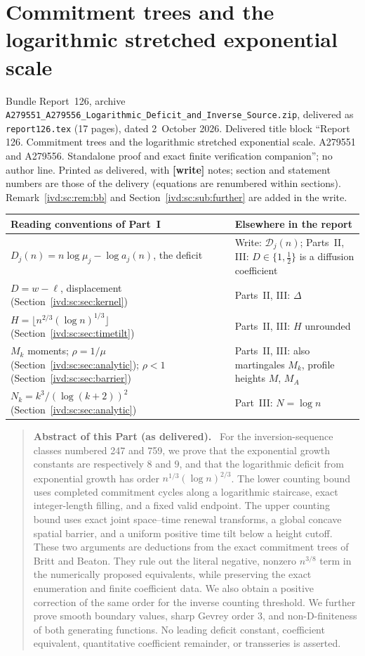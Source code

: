 \documentclass[11pt,letterpaper]{article}
\theoremstyle{remark}\newtheorem{remark}[theorem]{Remark}
\numberwithin{equation}{section}
\newcommand{\file}[1]{\nolinkurl{#1}}
\newcommand{\Dfc}{\mathcal D}
\newenvironment{partabstract}{\begin{quote}\small\noindent\textbf{Abstract of this Part (as delivered).}\ }{\end{quote}}
\newcommand{\partsource}[1]{\par\noindent\begin{minipage}{\textwidth}\small #1\end{minipage}\par\medskip}
\begin{document}
\part{Commitment trees and the logarithmic stretched exponential scale}\label{ivd:sc:part}
\partsource{Bundle Report~126, archive \file{A279551_A279556_Logarithmic_Deficit_and_Inverse_Source.zip}, delivered as \file{report126.tex} (17 pages), dated 2~October 2026. Delivered title block ``Report 126. Commitment trees and the logarithmic stretched exponential scale. A279551 and A279556. Standalone proof and exact finite verification companion''; no author line. Printed as delivered, with \textbf{[write]} notes; section and statement numbers are those of the delivery (equations are renumbered within sections). Remark~\ref{ivd:sc:rem:bb} and Section~\ref{ivd:sc:sub:further} are added in the write.}
\begin{center}
\small
\begin{tabular}{@{}>{\raggedright\arraybackslash}p{} >{\raggedright\arraybackslash}p{}@{}}
\toprule
Reading conventions of Part~I & Elsewhere in the report\\
\midrule
$D_j(n)=n\log\mu_j-\log a_j(n)$, the deficit & Write: $\Dfc_j(n)$; Parts~II, III: $D\in\{1,\frac12\}$ is a diffusion coefficient\\
$D=w-\ell$, displacement (Section~\ref{ivd:sc:sec:kernel}) & Parts~II, III: $\Delta$\\
$H=\lfloor n^{2/3}(\log n)^{1/3}\rfloor$ (Section~\ref{ivd:sc:sec:timetilt}) & Parts~II, III: $H$ unrounded\\
$M_k$ moments; $\rho=1/\mu$ (Section~\ref{ivd:sc:sec:analytic}); $\rho<1$ (Section~\ref{ivd:sc:sec:barrier}) & Parts~II, III: also martingales $M_k$, profile heights $M$, $M_A$\\
$N_k=k^3/(\log(k+2))^2$ (Section~\ref{ivd:sc:sec:analytic}) & Part~III: $N=\log n$\\
\bottomrule
\end{tabular}
\end{center}
\begin{partabstract}
For the inversion-sequence classes numbered 247 and 759, we prove that the
exponential growth constants are respectively $8$ and $9$, and that the
logarithmic deficit from exponential growth has order
$n^{1/3}(\log n)^{2/3}$. The lower counting bound uses completed commitment
cycles along a logarithmic staircase, exact integer-length filling, and a
fixed valid endpoint. The upper counting bound uses exact joint
space--time renewal transforms, a global concave spatial barrier, and a
uniform positive time tilt below a height cutoff. These two arguments
are deductions from the exact commitment trees of Britt and Beaton.
They rule out the literal negative, nonzero $n^{3/8}$ term in the
numerically proposed equivalents, while preserving the exact enumeration
and finite coefficient data. We also obtain a positive correction of the
same order for the inverse counting threshold. We further prove smooth boundary values, sharp Gevrey order
$3$, and non-D-finiteness of both generating functions. No leading
deficit constant, coefficient equivalent, quantitative coefficient
remainder, or transseries is asserted.
\end{partabstract}
\end{document}
